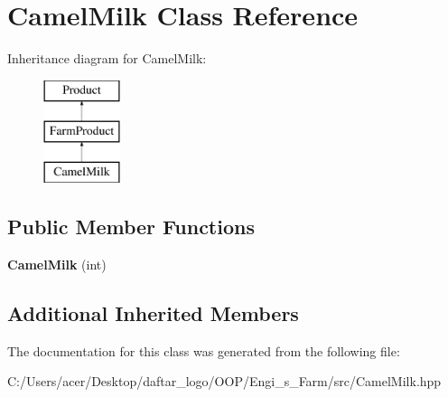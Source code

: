 \hypertarget{class_camel_milk}{}\section{Camel\+Milk Class Reference}
\label{class_camel_milk}
Inheritance diagram for Camel\+Milk\+:\begin{figure}[H]
\begin{center}
\leavevmode
\includegraphics[height=3.000000cm]{class_camel_milk}
\end{center}
\end{figure}
\subsection*{Public Member Functions}
\begin{DoxyCompactItemize}
\item 
\mbox{\label{class_camel_milk_a8232e83022cc25b47c4ac3c02642d922}} 
{\bfseries Camel\+Milk} (int)
\end{DoxyCompactItemize}
\subsection*{Additional Inherited Members}


The documentation for this class was generated from the following file\+:\begin{DoxyCompactItemize}
\item 
C\+:/\+Users/acer/\+Desktop/daftar\+\_\+logo/\+O\+O\+P/\+Engi\+\_\+s\+\_\+\+Farm/src/Camel\+Milk.\+hpp\end{DoxyCompactItemize}
